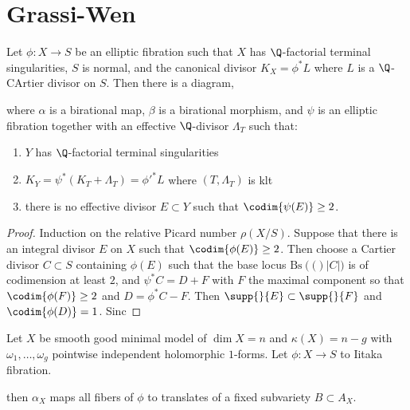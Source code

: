 \documentclass[12pt]{article}
\begin{document}
\section{Grassi-Wen}

\newcommand{\Bs}[1]{\mathrm{Bs}\left( #1 \right)}

\begin{theorem}
Let $\phi : X \to S$ be an elliptic fibration such that $X$ has $\Q$-factorial terminal singularities, $S$ is normal, and the canonical divisor $K_X = \phi^* L$ where $L$ is a $\Q$-CArtier divisor on $S$. Then there is a diagram,
\begin{center}
\end{center}
where $\alpha$ is a birational map, $\beta$ is a birational morphism, and $\psi$ is an elliptic fibration together with an effective $\Q$-divisor $\Lambda_T$ such that:
\begin{enumerate}
\item $Y$ has $\Q$-factorial terminal singularities
\item $K_Y = \psi^* (K_T + \Lambda_T) = \phi'^* L$ where $(T,\Lambda_T)$ is klt

\item there is no effective divisor $E \subset Y$ such that $\codim{\psi(E)} \ge 2$.
\end{enumerate}
\end{theorem}

\begin{proof}
Induction on the relative Picard number $\rho(X/S)$. Suppose that there is an integral divisor $E$ on $X$ such that $\codim{\phi(E)} \ge 2$. Then choose a Cartier divisor $C \subset S$ containing $\phi(E)$ such that the base locus $\Bs(|C|)$ is of codimension at least $2$, and $\psi^* C = D + F$ with $F$ the maximal component so that $\codim{\phi(F)} \ge 2$ and $D = \phi^* C - F$. Then $\supp{}{E} \subset \supp{}{F}$ and $\codim{\phi(D)} = 1$. Sinc
\end{proof}



Let $X$ be smooth good minimal model of $\dim{X} = n$ and $\kappa(X) = n - g$ with $\omega_1, \dots, \omega_g$ pointwise independent holomorphic $1$-forms. Let $\phi : X \to S$ to Iitaka fibration.
\begin{center}
\end{center}
then $\alpha_X$ maps all fibers of $\phi$ to translates of a fixed subvariety $B \subset A_X$.
\end{document}
